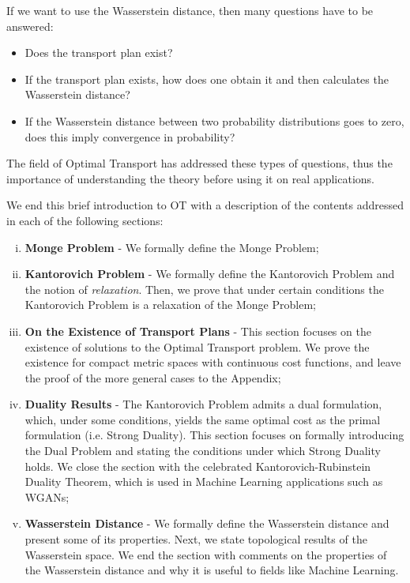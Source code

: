 If we want to use the Wasserstein distance, then many questions have to be answered:
\begin{itemize}
  \item Does the transport plan exist?
  \item If the transport plan exists, how does one obtain it and then calculates the Wasserstein distance?
  \item If the Wasserstein distance between two probability distributions goes to zero,
  does this imply convergence in probability?
\end{itemize}

The field of Optimal Transport has addressed these types of questions, thus the importance of understanding
the theory before using it on real applications.

We end this brief introduction to OT with a description of
the contents addressed in each of the following sections:
\begin{enumerate}[(i)]
  \item \textbf{Monge Problem} - We formally define the Monge Problem;

  \item \textbf{Kantorovich Problem} - We formally define the Kantorovich Problem and
  the notion of \textit{relaxation}. Then, we prove that under certain conditions
  the Kantorovich Problem is a relaxation of the Monge Problem;

  \item \textbf{On the Existence of Transport Plans} - This section focuses on
  the existence of solutions to the Optimal Transport problem.
  We prove the existence for compact
  metric spaces with continuous cost functions, and leave
  the proof of the more general cases to the Appendix;
  
  \item \textbf{Duality Results} - The Kantorovich Problem
  admits a dual formulation, which, under some conditions, yields the same
  optimal cost as the primal formulation (i.e. Strong Duality). 
  This section focuses on formally introducing the Dual Problem and stating the conditions
  under which Strong Duality holds.
  We close the section with the celebrated Kantorovich-Rubinstein Duality
  Theorem, which is used in Machine Learning applications such as WGANs;

  \item \textbf{Wasserstein Distance} - We formally define the Wasserstein distance and present
  some of its properties. Next, we state topological results of the Wasserstein space.
  We end the section with comments on the properties of the Wasserstein distance and why
  it is useful to fields like Machine Learning.
\end{enumerate}


